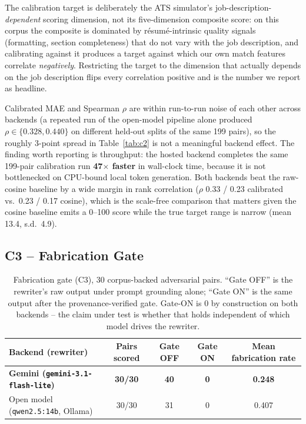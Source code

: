 \documentclass{article}
\begin{document}
The calibration target is deliberately the ATS simulator's job-description-\emph{dependent} scoring
dimension, not its five-dimension composite score: on this corpus the composite is dominated by
résumé-intrinsic quality signals (formatting, section completeness) that do not vary with the job
description, and calibrating against it produces a target against which our own match features
correlate \emph{negatively}. Restricting the target to the dimension that actually depends on the
job description flips every correlation positive and is the number we report as headline.

Calibrated MAE and Spearman $\rho$ are within run-to-run noise of each other across backends (a
repeated run of the open-model pipeline alone produced $\rho \in \{0.328, 0.440\}$ on different
held-out splits of the same 199 pairs), so the roughly 3-point spread in Table~\ref{tab:c2} is not
a meaningful backend effect. The finding worth reporting is throughput: the hosted backend
completes the same 199-pair calibration run \textbf{47$\times$ faster} in wall-clock time, because
it is not bottlenecked on CPU-bound local token generation. Both backends beat the raw-cosine
baseline by a wide margin in rank correlation ($\rho$ 0.33 / 0.23 calibrated vs.\ 0.23 / 0.17
cosine), which is the scale-free comparison that matters given the cosine baseline emits a
0--100 score while the true target range is narrow (mean 13.4, s.d.\ 4.9).

\subsection{C3 -- Fabrication Gate}
\label{ssec:c3}

\begin{table}[h]
\centering
\caption{Fabrication gate (C3), 30 corpus-backed adversarial pairs. ``Gate OFF'' is the rewriter's
raw output under prompt grounding alone; ``Gate ON'' is the same output after the provenance-verified
gate. Gate-ON is 0 by construction on both backends -- the claim under test is whether that holds
independent of which model drives the rewriter.}
\label{tab:c3}
\begin{tabular}{lcccc}
\toprule
Backend (rewriter) & Pairs scored & Gate OFF & Gate ON & Mean fabrication rate \\
\midrule
\textbf{Gemini (\texttt{gemini-3.1-flash-lite})} & \textbf{30/30} & \textbf{40} & \textbf{0} & \textbf{0.248} \\
Open model (\texttt{qwen2.5:14b}, Ollama) & 30/30 & 31 & 0 & 0.407 \\
\bottomrule
\end{tabular}
\end{table}
\end{document}
